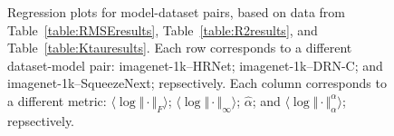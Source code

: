 \begin{figure}[t]
{        \label{fig:summary_regressions_C_10}
    }
    \caption{Regression plots for model-dataset pairs, based on data from Table~\ref{table:RMSEresults}, Table~\ref{table:R2results}, and Table~\ref{table:Ktauresults}.
             Each row corresponds to a different dataset-model pair:
             imagenet-1k--HRNet;
             imagenet-1k--DRN-C;
             and
             imagenet-1k--SqueezeNext;
             repsectively.
             Each column corresponds to a different metric:
             $\langle\log\Vert\cdot\Vert_{F}\rangle$; 
             $\langle\log\Vert\cdot\Vert_{\infty}\rangle$; 
             $\hat{\alpha}$; 
             and
             $\langle\log\Vert\cdot\Vert^{\alpha}_{\alpha}\rangle$;
             repsectively.
            }
    \label{fig:summary_regressions_C}
\end{figure}

